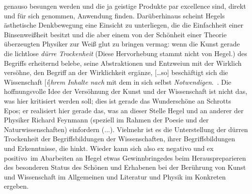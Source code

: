   genauso besungen werden und die ja geistige Produkte par excellence sind,
  direkt und für sich genommen, Anwendung finden.
Darüberhinaus scheint Hegels ästhetische Denkbewegung eine Einsicht
  zu unterliegen, die die Einfachheit einer Binsenwei\ss heit besitzt und die
  aber einem von der Schönheit einer Theorie überzeugten Physiker zur Wei\ss
  glut zu bringen vermag:
  \glqq[\ldots] wenn die Kunst gerade die lichtlose \emph{dürre Trockenheit}
  (Diese Hervorhebung stammt nicht von Hegel.) des Begriffs erheiternd belebe,
  seine Abstraktionen und Entzweiun mit der Wirklich versöhne, den Begriff an
  der Wirklichkeit ergänze, [\ldots so] beschäftigt sich die Wissenschaft 
  [\emph{i}]\emph{hrem Inhalte nach} mit dem in sich selbst
  \emph{Notwendigen}.\grqq\ \citep[S.~19]{Hegel1986}.
Die hoffnungsvolle Idee der Versöhnung der Kunst und der Wissenschaft ist
  nicht das, was hier kritisiert werden soll; dies ist gerade das Wunderschöne an
  Schrotts Epos; er realisiert hier gerade das, was an dieser Stelle Hegel und an anderer
  der Physiker Richard Feynmann (speziell im Rahmen der Poesie und der
  Naturwissenschaften) einfordern (...).
Vielmehr ist es die Unterstellung der dürren Trockenheit der Begriffsbildungen
  der Wissenschaften, ihrer Begriffsbildungen und Erkenntnisse, die hinkt.
Wieder kann sich also ex negativo und \glqq ex positivo\grqq\ im Abarbeiten an
  Hegel etwas Gewinnbringedes beim Herauspreparieren des besonderen
  Status des Schönen und Erhabenen bei der Berührung von Kunst und
  Wissenschaft im Allgemeinen und Literatur und Physik im Konkreten ergeben. 
